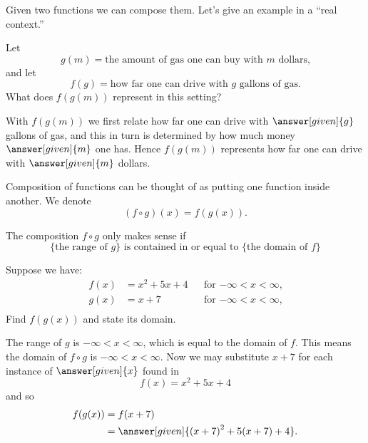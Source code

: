 \documentclass{ximera}
\begin{document}


Given two functions we can compose them. Let's give an example in a
``real context.''

\begin{example}
  Let
  \[
  g(m) = \text{the amount of gas one can buy with $m$ dollars,}
  \]
  and let
  \[
  f(g) = \text{how far one can drive with $g$ gallons of gas.}
  \]
  What does $f(g(m))$ represent in this setting?
  \begin{explanation}
    With $f(g(m))$ we first relate how far one can drive with
    $\answer[given]{g}$ gallons of gas, and this in turn is determined
    by how much money $\answer[given]{m}$ one has. Hence $f(g(m))$ represents how far
    one can drive with $\answer[given]{m}$ dollars.
  \end{explanation}
\end{example}

Composition of functions can be thought of as putting one function
inside another.  We denote
\[
(f\circ g)(x) = f(g(x)).
\]
\begin{warning}
  The composition $f\circ g$ only makes sense if
  \[
  \{\text{the range of $g$}\}
  \text{ is contained in or equal to }
  \{\text{the domain of $f$}\}
  \]
\end{warning}

\begin{example}
 Suppose we have:
\begin{align*}
  f(x)&={{x}^{2}}+5x+4 &&\text{for $-\infty< x< \infty$,}\\
  g(x)&= x+7 &&\text{for $-\infty< x< \infty$,}\\
\end{align*}
Find $f(g(x))$ and state its domain.
\begin{explanation}
  The range of $g$ is $-\infty< x< \infty$, which is equal to the
  domain of $f$. This means the domain of $f\circ g$ is $-\infty< x<
  \infty$. Now we may substitute $x+7$ for each instance of $\answer[given]{x}$ found
  in
  \[
  f(x)={{x}^{2}}+5x+4
  \]
  and so
  \begin{align*}
  f(g(x)) &=f(x+7)\\
  &=\answer[given]{{{(x+7)}^{2}}+5(x+7)+4}.
  \end{align*}
\end{explanation}
\end{example}
\end{document}
